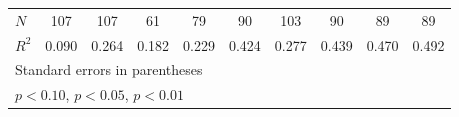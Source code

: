 {\begin{tabular}{l*{9}{c}}
\hline
\(N\)       &         107         &         107         &          61         &          79         &          90         &         103         &          90         &          89         &          89         \\
\(R^{2}\)   &       0.090         &       0.264         &       0.182         &       0.229         &       0.424         &       0.277         &       0.439         &       0.470         &       0.492         \\
\hline\hline
\multicolumn{10}{l}{\footnotesize Standard errors in parentheses}\\
\multicolumn{10}{l}{\footnotesize \sym{*} \(p<0.10\), \sym{**} \(p<0.05\), \sym{***} \(p<0.01\)}\\
\end{tabular}
}
